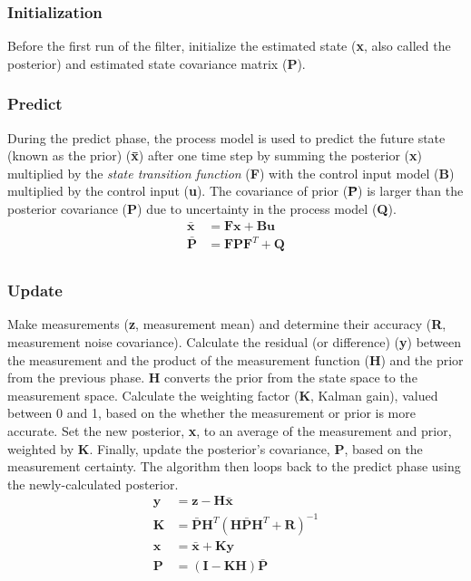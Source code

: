 \subsubsection*{Initialization}
Before the first run of the filter, initialize the estimated state (\textbf{x}, also called the posterior) and estimated state covariance matrix (\textbf{P}).
\subsubsection*{Predict}
During the predict phase, the process model is used to predict the future state (known as the prior) (\textbf{\=x}) after one time step by summing the posterior (\textbf{x}) multiplied by the \textit{state transition function} (\textbf{F}) with the control input model (\textbf{B}) multiplied by the control input (\textbf{u}). The covariance of prior (\textbf{\=P}) is larger than the posterior covariance (\textbf{P}) due to uncertainty in the process model (\textbf{Q}).
\begin{align*}
\bar{\textbf{x}} &= \textbf{Fx} + \textbf{Bu}\\
\bar{\textbf{P}} &= \textbf{FPF}^T + \textbf{Q}\\
\end{align*}

\subsubsection*{Update}
Make measurements (\textbf{z}, measurement mean) and determine their accuracy (\textbf{R}, measurement noise covariance). Calculate the residual (or difference) (\textbf{y}) between the measurement and the product of the measurement function (\textbf{H}) and the prior from the previous phase. \textbf{H} converts the prior from the state space to the measurement space. Calculate the weighting factor (\textbf{K}, Kalman gain), valued between 0 and 1, based on the whether the measurement or prior is more accurate. Set the new posterior, \textbf{x}, to an average of the measurement and prior, weighted by \textbf{K}. Finally, update the posterior's covariance, \textbf{P}, based on the measurement certainty. The algorithm then loops back to the predict phase using the newly-calculated posterior.
\begin{align*}
\textbf{y} &= \textbf{z} - \textbf{H}\bar{\textbf{x}}\\
\textbf{K} &= \bar{\textbf{P}}\textbf{H}^T(\textbf{H}\bar{\textbf{P}}\textbf{H}^T+\textbf{R})^{-1}\\
\textbf{x} &= \bar{\textbf{x}} + \textbf{Ky}\\
\textbf{P} &= (\textbf{I}-\textbf{KH})\bar{\textbf{P}}\\
\end{align*}

